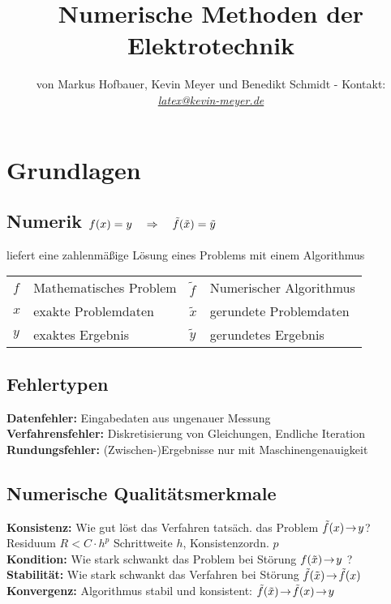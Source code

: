 \documentclass[german]{latex4ei/latex4ei_sheet}
\title{Numerische Methoden der Elektrotechnik}
\author{von Markus Hofbauer, Kevin Meyer und Benedikt Schmidt - Kontakt:  \href{mailto:latex@kevin-meyer.de}{\textit{latex@kevin-meyer.de}}}
\begin{document}


\maketitle

\section{Grundlagen}
\begin{sectionbox}
	\subsection[Numerik]{Numerik $f(x) = y \quad \Rightarrow \quad \tilde f(\tilde x) = \tilde y$} 
	liefert eine zahlenmäßige Lösung eines Problems mit einem Algorithmus\\[-1em]
	\begin{symbolbox}
		\begin{tabular*}{\columnwidth}{@{\ }l@{\ }l@{\qquad}l@{\ }l@{}}
			$f$ & Mathematisches Problem & $\tilde f$ & Numerischer Algorithmus\\
			$x$ & exakte Problemdaten & $\tilde x$ & gerundete Problemdaten\\
			$y$ & exaktes Ergebnis & $\tilde y$ & gerundetes Ergebnis\\
		\end{tabular*}
	\end{symbolbox}

	\subsection{Fehlertypen}
	\textbf{Datenfehler:} Eingabedaten aus ungenauer Messung\\
	\textbf{Verfahrensfehler:} Diskretisierung von Gleichungen, Endliche Iteration\\
	\textbf{Rundungsfehler:} (Zwischen-)Ergebnisse nur mit Maschinengenauigkeit 

	\subsection{Numerische Qualitätsmerkmale}	
	\textbf{Konsistenz:} Wie gut löst das Verfahren tatsäch. das Problem $\tilde f(x)\!\rightarrow\!y$?\\
	Residuum $R < C \cdot h^p$ \quad Schrittweite $h$, Konsistenzordn. $p$\\
	\textbf{Kondition:} Wie stark schwankt das Problem bei Störung $f(\tilde x)\!\rightarrow\!y$ ?\\[0.1em]
	\textbf{Stabilität:} Wie stark schwankt das Verfahren bei Störung $\tilde f(\tilde x)\!\rightarrow\!\tilde f(x)$
	\textbf{Konvergenz:} Algorithmus stabil und konsistent:  $\tilde f(\tilde x)\!\rightarrow\!\tilde f(x)\!\rightarrow\!y$
\end{sectionbox}
\end{document}
